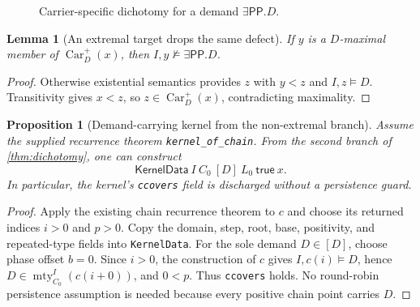 \documentclass[11pt,letterpaper]{article}
\newcommand{\PP}{\ensuremath{\mathsf{PP}}}
\newcommand{\mty}{\operatorname{mty}}
\newcommand{\sat}{\models}
\newcommand{\Car}{\operatorname{Car}}
\newcommand{\code}[1]{\nolinkurl{#1}}
\theoremstyle{definition}
\theoremstyle{plain}
\newtheorem{lemma}[definition]{Lemma}
\newtheorem{proposition}[definition]{Proposition}
\theoremstyle{remark}
\begin{document}
\begin{figure}[ht]
\centering
{}
\caption{Carrier-specific dichotomy for a demand $\exists\PP.D$.}
\end{figure}

\begin{lemma}[An extremal target drops the same defect]\label{lem:drop}
If $y$ is a $D$-maximal member of $\Car_D^+(x)$, then
$I,y\not\sat\exists\PP.D$.
\end{lemma}

\begin{proof}
Otherwise existential semantics provides $z$ with $y<z$ and $I,z\sat D$.
Transitivity gives $x<z$, so $z\in\Car_D^+(x)$, contradicting maximality.
\end{proof}

\begin{proposition}[Demand-carrying kernel from the non-extremal branch]
\label{prop:d-kernel}
Assume the supplied recurrence theorem \code{kernel_of_chain}.  From the second
branch of \cref{thm:dichotomy}, one can construct
\[
  \mathsf{KernelData}\ I\ C_0\ [D]\ L_0\ \mathsf{true}\ x.
\]
In particular, the kernel's \code{ccovers} field is discharged without a
persistence guard.
\end{proposition}

\begin{proof}
Apply the existing chain recurrence theorem to $c$ and choose its returned
indices $i>0$ and $p>0$.  Copy the domain, step, root, base, positivity, and
repeated-type fields into \code{KernelData}.  For the sole demand $D\in[D]$,
choose phase offset $b=0$.  Since $i>0$, the construction of $c$ gives
$I,c(i)\sat D$, hence $D\in\mty_{C_0}^{I}(c(i+0))$, and $0<p$.  Thus
\code{ccovers} holds.  No round-robin persistence assumption is needed because
every positive chain point carries $D$.
\end{proof}
\end{document}
